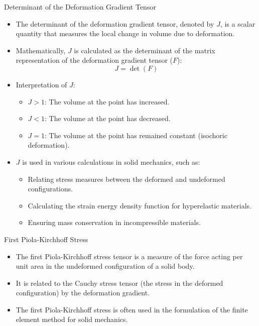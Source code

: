 \documentclass{beamer}
\begin{document}
\begin{frame}{Determinant of the Deformation Gradient Tensor}
\begin{itemize}
\item The determinant of the deformation gradient tensor, denoted by $J$, is a scalar quantity that measures the local change in volume due to deformation.
\item Mathematically, $J$ is calculated as the determinant of the matrix representation of the deformation gradient tensor ($F$):
\begin{equation*}
J = \det(F)
\end{equation*}
\item Interpretation of $J$:
\begin{itemize}
\item $J > 1$: The volume at the point has increased.
\item $J < 1$: The volume at the point has decreased.
\item $J = 1$: The volume at the point has remained constant (isochoric deformation).
\end{itemize}
\item $J$ is used in various calculations in solid mechanics, such as:
\begin{itemize}
\item Relating stress measures between the deformed and undeformed configurations.
\item Calculating the strain energy density function for hyperelastic materials.
\item Ensuring mass conservation in incompressible materials.
\end{itemize}
\end{itemize}
\end{frame}

\begin{frame}{First Piola-Kirchhoff Stress}
\begin{itemize}
\item The first Piola-Kirchhoff stress tensor is a measure of the force acting per unit area in the undeformed configuration of a solid body.
\item It is related to the Cauchy stress tensor (the stress in the deformed configuration) by the deformation gradient.
\item The first Piola-Kirchhoff stress is often used in the formulation of the finite element method for solid mechanics.
\end{itemize}
\end{frame}
\end{document}
